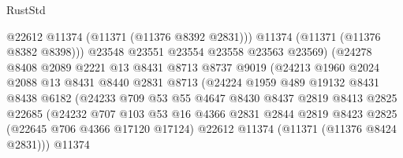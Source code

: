 \begin{lexlean}{RustStd}
\begin{coremodule}
                                  @22612
                                  @11374
                                  (@11371 (@11376 @8392 @2831)))
                                @11374
                                (@11371 (@11376 @8382 @8398)))
                              @23548
                              @23551
                              @23554
                              @23558
                              @23563
                              @23569)
                            (@24278
                              @8408
                              @2089
                              @2221
                              @13
                              @8431
                              @8713
                              @8737
                              @9019
                              (@24213
                                @1960
                                @2024
                                @2088
                                @13
                                @8431
                                @8440
                                @2831
                                @8713
                                (@24224
                                  @1959
                                  @489
                                  @19132
                                  @8431
                                  @8438
                                  @6182
                                  (@24233
                                    @709
                                    @53
                                    @55
                                    @4647
                                    @8430
                                    @8437
                                    @2819
                                    @8413
                                    @2825
                                    @22685
                                    (@24232
                                      @707
                                      @103
                                      @53
                                      @16
                                      @4366
                                      @2831
                                      @2844
                                      @2819
                                      @8423
                                      @2825
                                      (@22645 @706 @4366 @17120 @17124)
                                      @22612
                                      @11374
                                      (@11371 (@11376 @8424 @2831)))
                                    @11374

\end{coremodule}
\end{lexlean}

